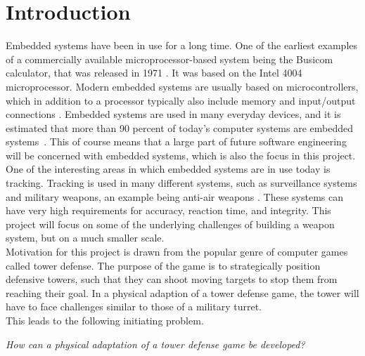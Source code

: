 \chapter{Introduction}\label{ch:introduction}
Embedded systems have been in use for a long time. One of the earliest examples of a commercially available microprocessor-based system being the Busicom calculator, that was released in 1971 \cite{intel4004}. It was based on the Intel 4004 microprocessor. Modern embedded systems are usually based on microcontrollers, which in addition to a processor typically also include memory and input/output connections \cite{micro}. Embedded systems are used in many everyday devices, and it is estimated that more than 90 percent of today's computer systems are embedded systems~\cite{embedded_nd}. This of course means that a large part of future software engineering will be concerned with embedded systems, which is also the focus in this project.\\

One of the interesting areas in which embedded systems are in use today is tracking. Tracking is used in many different systems, such as surveillance systems and military weapons, an example being anti-air weapons \cite{phalanx}. These systems can have very high requirements for accuracy, reaction time, and integrity. This project will focus on some of the underlying challenges of building a weapon system, but on a much smaller scale.\\

Motivation for this project is drawn from the popular genre of computer games called tower defense. The purpose of the game is to strategically position defensive towers, such that they can shoot moving targets to stop them from reaching their goal. In a physical adaption of a tower defense game, the tower will have to face challenges similar to those of a military turret.\\

This leads to the following initiating problem.
\begin{center}
\textit{How can a physical adaptation of a tower defense game be developed?}\\
\end{center}